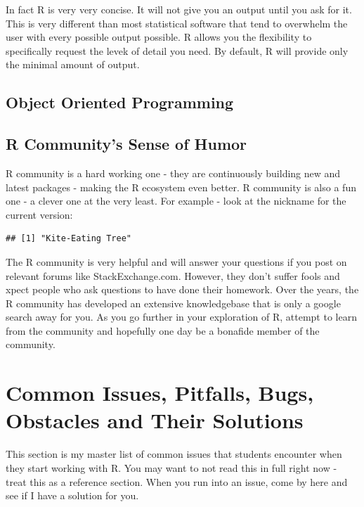 \documentclass[]{krantz}
\makeatletter
\newenvironment{Shaded}{\begin{snugshade}}{\end{snugshade}}
\newcommand{\OperatorTok}[1]{\textcolor[rgb]{0.81,0.36,0.00}{\textbf{#1}}}
\newcommand{\NormalTok}[1]{#1}
\newenvironment{kframe}{%
\medskip{}
\setlength{\fboxsep}{.8em}
 \def\at@end@of@kframe{}%
 \ifinner\ifhmode%
  \def\at@end@of@kframe{\end{minipage}}%
  \begin{minipage}{\columnwidth}%
 \fi\fi%
 \def\FrameCommand##1{\hskip\@totalleftmargin \hskip-\fboxsep
 \colorbox{shadecolor}{##1}\hskip-\fboxsep
     \hskip-\linewidth \hskip-\@totalleftmargin \hskip\columnwidth}%
 \MakeFramed {\advance\hsize-\width
   \@totalleftmargin\z@ \linewidth\hsize
   \@setminipage}}%
 {\par\unskip\endMakeFramed%
 \at@end@of@kframe}
\renewenvironment{Shaded}{\begin{kframe}}{\end{kframe}}
\theoremstyle{definition}
\theoremstyle{definition}
\theoremstyle{definition}
\theoremstyle{remark}
\makeatother
\begin{document}
In fact R is very very concise. It will not give you an output until you
ask for it. This is very different than most statistical software that
tend to overwhelm the user with every possible output possible. R allows
you the flexibility to specifically request the levek of detail you
need. By default, R will provide only the minimal amount of output.

\subsection{Object Oriented
Programming}\label{object-oriented-programming}

\subsection{R Community's Sense of
Humor}\label{r-communitys-sense-of-humor}

R community is a hard working one - they are continuously building new
and latest packages - making the R ecosystem even better. R community is
also a fun one - a clever one at the very least. For example - look at
the nickname for the current version:

\begin{Shaded}
\end{Shaded}

\begin{verbatim}
## [1] "Kite-Eating Tree"
\end{verbatim}

The R community is very helpful and will answer your questions if you
post on relevant forums like StackExchange.com. However, they don't
suffer fools and xpect people who ask questions to have done their
homework. Over the years, the R community has developed an extensive
knowledgebase that is only a google search away for you. As you go
further in your exploration of R, attempt to learn from the community
and hopefully one day be a bonafide member of the community.

\section{Common Issues, Pitfalls, Bugs, Obstacles and Their
Solutions}\label{common-issues-pitfalls-bugs-obstacles-and-their-solutions}

This section is my master list of common issues that students encounter
when they start working with R. You may want to not read this in full
right now - treat this as a reference section. When you run into an
issue, come by here and see if I have a solution for you.
\end{document}
